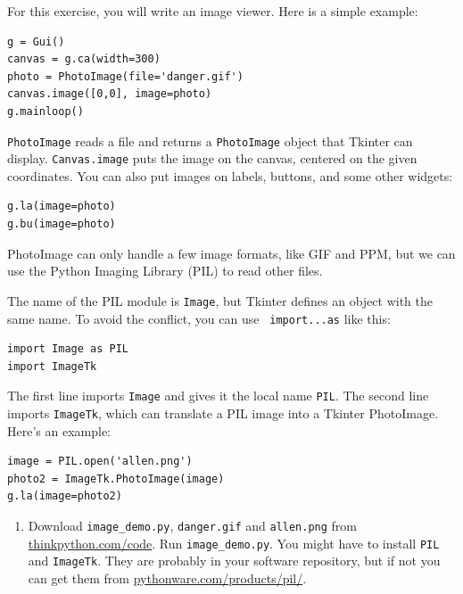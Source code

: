 \documentclass[10pt]{book}
\begin{document}
\begin{ex}

For this exercise, you will write an image viewer.  Here is
a simple example:

\beforeverb
\begin{verbatim}
g = Gui()
canvas = g.ca(width=300)
photo = PhotoImage(file='danger.gif')
canvas.image([0,0], image=photo)
g.mainloop()
\end{verbatim}
\afterverb
%
{\tt PhotoImage} reads a file and returns a {\tt PhotoImage} object
that Tkinter can display.  {\tt Canvas.image} puts the image on the
canvas, centered on the given coordinates.  You can also put images on
labels, buttons, and some other widgets:

\beforeverb
\begin{verbatim}
g.la(image=photo)
g.bu(image=photo)
\end{verbatim}
\afterverb
%
PhotoImage can only handle a few image formats, like GIF and PPM, 
but we can use the Python Imaging Library (PIL) to read other
files.


The name of the PIL module is {\tt Image}, but Tkinter defines an
object with the same name.  To avoid the conflict, you can use {\tt
  import...as} like this:

\beforeverb
\begin{verbatim}
import Image as PIL
import ImageTk
\end{verbatim}
\afterverb
%
The first line imports {\tt Image} and
gives it the local name {\tt PIL}.  The second
line imports {\tt ImageTk}, which can translate a PIL
image into a Tkinter PhotoImage.  Here's an example:

\beforeverb
\begin{verbatim}
image = PIL.open('allen.png')
photo2 = ImageTk.PhotoImage(image)
g.la(image=photo2)
\end{verbatim}
\afterverb
%

\begin{enumerate}

\item Download \verb"image_demo.py", \verb"danger.gif" and \verb"allen.png"
from \url{thinkpython.com/code}.  Run \verb"image_demo.py".  You
might have to install {\tt PIL} and {\tt ImageTk}.  
They are probably in your software repository,  but if not
you can get them from \url{pythonware.com/products/pil/}.


\end{enumerate}
\end{ex}
\end{document}
